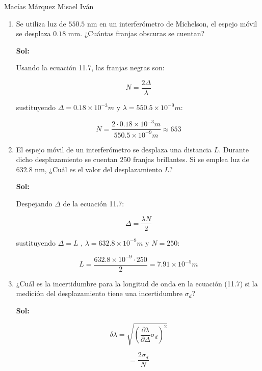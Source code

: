 \documentclass[12pt,a4paper]{article}
\begin{document}
Macías Márquez Misael Iván

\begin{enumerate}






\item Se utiliza luz de $550.5 \text{ nm}$ en un interferómetro de Michelson, el espejo móvil se desplaza $0.18\text{ mm}$. ¿Cuántas franjas obscuras se cuentan?

\textbf{Sol:}

Usando la ecuación 11.7, las franjas negras son:

\begin{equation*}
    N = \frac{2\Delta }{\lambda}
\end{equation*}

sustituyendo $\Delta = 0.18 \times 10^{-3} m$ y $\lambda = 550.5 \times 10^{-9} m$:

\begin{equation*}
    N = \frac{2 \cdot 0.18 \times 10^{-3} m}{550.5 \times 10^{-9} m} \approx 653
\end{equation*}







\item El espejo móvil de un interferómetro se desplaza una distancia $L$. Durante dicho desplazamiento se cuentan $250$ franjas brillantes. Si se emplea luz de $632.8 \text{ nm}$, ¿Cuál es el valor del desplazamiento $L$?

\textbf{Sol:}

Despejando $\Delta$  de la ecuación 11.7:

\begin{equation*}
    \Delta = \frac{\lambda N}{2}
\end{equation*}

sustituyendo $\Delta =L$ , $\lambda = 632.8 \times 10^{-9}m$ y $N =250$:

\begin{equation*}
    L = \frac{632.8 \times 10^{-9} \cdot 250}{2} = 7.91 \times 10^{-5} m
\end{equation*}






\item ¿Cuál es la incertidumbre para la longitud de onda en la ecuación (11.7) si la medición del desplazamiento tiene una incertidumbre $\sigma_{d}$?

\textbf{Sol:}

\begin{equation*}
    \delta \lambda = \sqrt{\left(\frac{\partial \lambda}{\partial \Delta} \sigma_d \right)^{2}}
\end{equation*}

\begin{equation*}
    = \frac{2\sigma_d }{N}
\end{equation*}

    
    
\end{enumerate}
\end{document}
